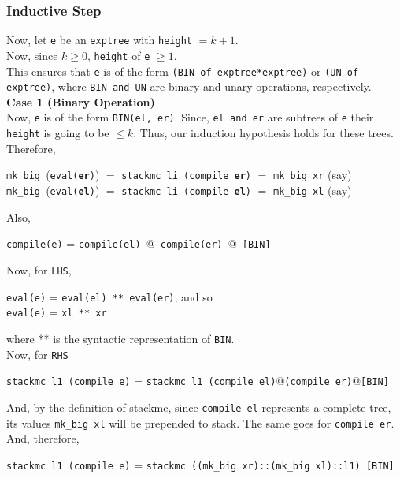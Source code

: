 \documentclass{article}
\begin{document}
\subsubsection*{Inductive Step}
Now, let \texttt{e} be an \texttt{exptree} with \texttt{height} \(= k+1 \).\\[5pt]Now, since  \( k \geq 0\), \texttt{height} of \texttt{e} \( \geq 1\).\\[5pt] This ensures that \texttt{e} is of the form \texttt{(BIN of exptree*exptree)} or \texttt{(UN of exptree)}, where \texttt{BIN and UN} are binary and unary operations, respectively. \\[10 pt]
\textbf{Case 1 (Binary Operation)} \\ [5 pt]
    Now, \texttt{e} is of the form \texttt{BIN(el, er)}. Since, \texttt{el and er} are subtrees of \texttt{e} their \texttt{height} is going to be \( \leq k\). Thus, our induction hypothesis holds for these trees. Therefore,
    \begin{center}
        \texttt{mk\_big }(\texttt{eval(\textbf{er})}) \(=\) \texttt{stackmc li (compile \textbf{er})} \(=\) \texttt{mk\_big xr} (say) \\
        \texttt{mk\_big }(\texttt{eval(\textbf{el})}) \(=\) \texttt{stackmc li (compile \textbf{el})} \(=\) \texttt{mk\_big xl} (say)
    \end{center}
    Also,
    \begin{center}
        \texttt{compile(e)} = \texttt{compile(el) $@$ compile(er) $@$ [BIN]}   
    \end{center}
    Now, for \texttt{LHS}, 
    \begin{center}
        \texttt{eval(e)} = \texttt{eval(el) ** eval(er)}, and so \\
        \texttt{eval(e)} = \texttt{xl ** xr}                            
    \end{center}
    where ** is the syntactic representation of \texttt{BIN}. \\[5pt]
    Now, for \texttt{RHS} 
    \begin{center}
        {\small \texttt{stackmc l1 (compile e)} = \texttt{stackmc l1 (compile el)$@$(compile er)$@$[BIN]}}
    \end{center}
    And, by the definition of stackmc, since \texttt{compile el} represents a complete tree, its values \texttt{mk\_big xl} will be prepended to stack. The same goes for \texttt{compile er}. And, therefore,
    \begin{center}
        {\small \texttt{stackmc l1 (compile e)} = \texttt{stackmc ((mk\_big xr)::(mk\_big xl)::l1) [BIN]}}
    \end{center}
\end{document}
